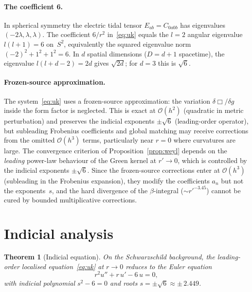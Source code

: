 \documentclass[a4paper,12pt]{article}
\newtheorem{theorem}{Theorem}
\newcommand{\calO}{\mathcal{O}}
\begin{document}
\paragraph{The coefficient 6.}
In spherical symmetry the electric tidal tensor
$E_{ab}=C_{0a0b}$ has eigenvalues $(-2\lambda,\lambda,\lambda)$.
The coefficient $6/r^2$ in~\eqref{eq:uk} equals the $l\!=\!2$ angular
eigenvalue $l(l+1)=6$ on~$S^2$, equivalently the squared eigenvalue norm
$(-2)^2+1^2+1^2=6$.
In $d$ spatial dimensions ($D=d+1$ spacetime), the eigenvalue
$l(l+d-2)=2d$ gives $\sqrt{2d}$; for $d=3$ this is $\sqrt{6}$.

\paragraph{Frozen-source approximation.}
The system~\eqref{eq:uk} uses a frozen-source approximation: the
variation $\delta\Box/\delta g$ inside the form factor is neglected.
This is exact at $\calO(h^2)$ (quadratic in metric perturbation) and
preserves the indicial exponents $\pm\sqrt{6}$ (leading-order operator),
but subleading Frobenius coefficients and global matching may receive
corrections from the omitted $\calO(h^3)$ terms, particularly near
$r=0$ where curvatures are large.
The convergence criterion of Proposition~\ref{prop:weyl} depends on
the \emph{leading} power-law behaviour of the Green kernel at $r'\to 0$,
which is controlled by the indicial exponents $\pm\sqrt{6}$.
Since the frozen-source corrections enter at $\calO(h^3)$ (subleading
in the Frobenius expansion), they modify the coefficients $a_n$
but not the exponents~$s$, and the hard divergence of the
$\beta$-integral ($\sim r'^{-3.45}$) cannot be cured by bounded
multiplicative corrections.

\section{Indicial analysis}\label{sec:indicial}

\begin{theorem}[Indicial equation]\label{thm:indicial}
On the Schwarzschild background, the leading-order localised
equation~\eqref{eq:uk} at $r\to 0$ reduces to the Euler equation
\begin{equation}\label{eq:euler}
  r^2 u'' + r\,u' - 6\,u = 0,
\end{equation}
with indicial polynomial $s^2-6=0$ and roots
$s = \pm\sqrt{6} \approx \pm\,2.449$.
\end{theorem}
\end{document}
